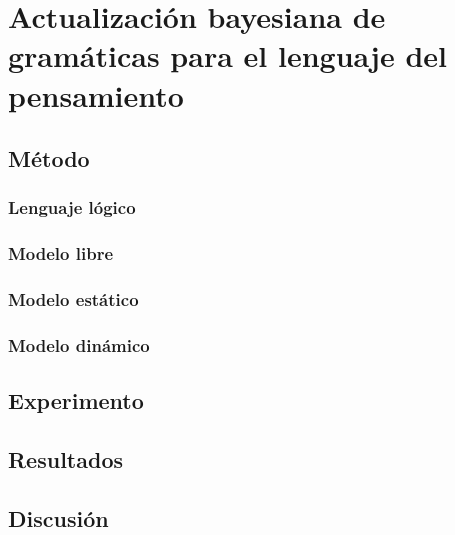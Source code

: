 \chapter{Actualización bayesiana de gramáticas para el lenguaje del pensamiento}

\section{Método}
\subsection{Lenguaje lógico}
\subsection{Modelo libre}
\subsection{Modelo estático}
\subsection{Modelo dinámico}
\section{Experimento}
\section{Resultados}
\section{Discusión}
